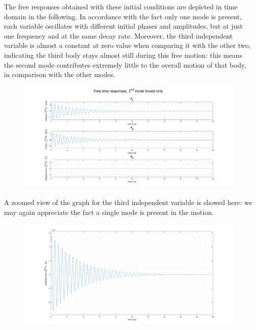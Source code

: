 \documentclass[a4paper,12pt,oneside]{article}
\begin{document}
\vspace{10pt}

The free responses obtained with these initial conditions are depicted in time domain in the following. In accordance with the fact only one mode is present, each variable oscillates with different initial phases and amplitudes, but at just one frequency and at the same decay rate. Moreover, the third independent variable is almost a constant at zero value when comparing it with the other two, indicating the third body stays almost still during this free motion: this means the second mode contributes extremely little to the overall motion of that body, in comparison with the other modes.

\begin{figure}[h]
	\hspace{-70pt}
	\includegraphics[scale=0.4]{free_time_responses_mode2}
\end{figure}

A zoomed view of the graph for the third independent variable is showed here: we may again appreciate the fact a single mode is present in the motion.

\clearpage

\begin{figure}[h]
	\hspace{-70pt}
	\includegraphics[scale=0.4]{free_time_responses_mode2_x3}
\end{figure}
\end{document}
